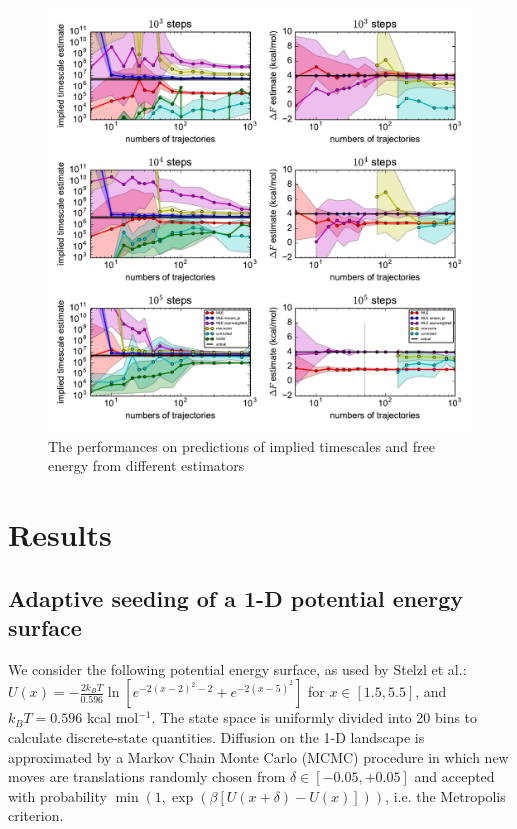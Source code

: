 \documentclass[%
 aip,
rsi,%
 amsmath,amssymb,
 reprint,%
]{revtex4-1}
\begin{document}
\begin{figure}
\includegraphics[width=1.5\columnwidth]{figures/convergence_oct2018.pdf}%
\caption{\label{fig:wide}The performances on predictions of implied timescales and free energy from different estimators}
\end{figure}

\section{Results}

\subsection{Adaptive seeding of a 1-D potential energy surface}

We consider the following potential energy surface, as used by Stelzl et al.\cite{Stelzl:2017gra}:  $U(x) = -\frac{2k_BT}{0.596} \ln [ e^{-2(x-2)^2-2} + e^{-2(x-5)^2} ] $
for $x \in [1.5,5.5]$, and $k_BT = 0.596$ kcal mol$^{-1}$.  The state space is uniformly divided into 20 bins to calculate discrete-state quantities. Diffusion on the 1-D landscape is approximated by a Markov Chain Monte Carlo (MCMC) procedure in which new moves are translations randomly chosen from $\delta \in [-0.05, +0.05]$ and accepted with probability $\min(1, \exp( \beta [U(x+\delta)-U(x)]))$, i.e. the Metropolis criterion.
\end{document}
